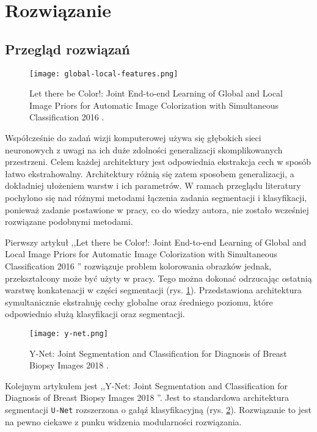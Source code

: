 \newpage %
\section{Rozwiązanie}
\subsection{Przegląd rozwiązań}

\begin{figure}
    \texttt{[image: global-local-features.png]}
    \caption{Let there be Color!: Joint End-to-end Learning of Global and Local Image Priors for Automatic Image Colorization with Simultaneous Classification 2016 \cite{iizuka2016let}.}
    \label{fig:parrarel-arch}
\end{figure}

Współcześnie do zadań wizji komputerowej używa się głębokich sieci neuronowych z uwagi na ich duże zdolności generalizacji skomplikowanych przestrzeni. Celem każdej architektury jest odpowiednia ekstrakcja cech w sposób łatwo ekstrahowalny. Architektury różnią się zatem sposobem generalizacji, a dokładniej ułożeniem warstw i ich parametrów. W ramach przeglądu literatury pochylono się nad różnymi metodami łączenia zadania segmentacji i klasyfikacji, ponieważ zadanie postawione w pracy, co do wiedzy autora, nie zostało wcześniej rozwiązane podobnymi metodami.

Pierwszy artykuł ,,Let there be Color!: Joint End-to-end Learning of Global and Local Image Priors for Automatic Image Colorization with Simultaneous Classification 2016 \cite{iizuka2016let}'' rozwiązuje problem kolorowania obrazków jednak, przekształcony może być użyty w pracy. Tego można dokonać odrzucając ostatnią warstwę konkatenacji w części segmentacji (rys. \ref{fig:parrarel-arch}). Przedstawiona architektura symultanicznie ekstrahuję cechy globalne oraz średniego poziomu, które odpowiednio służą klasyfikacji oraz segmentacji.

\begin{figure}
    \texttt{[image: y-net.png]}
    \caption{Y-Net: Joint Segmentation and Classification for Diagnosis of Breast Biopsy Images 2018 \cite{mehta2018net}.}
    \label{fig:y-net}
\end{figure}

Kolejnym artykułem jest ,,Y-Net: Joint Segmentation and Classification for Diagnosis of Breast Biopsy Images 2018 \cite{mehta2018net}''. Jest to standardowa architektura segmentacji \texttt{U-Net} rozszerzona o gałąź klasyfikacyjną (rys. \ref{fig:y-net}). Rozwiązanie to jest na pewno ciekawe z punku widzenia modularności rozwiązania.

